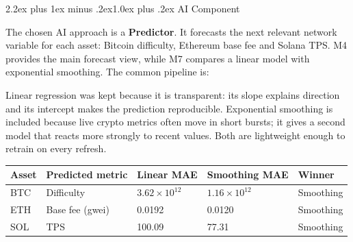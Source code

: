 \documentclass[11pt,a4paper]{article}
\makeatletter
\renewcommand{\section}{\@startsection{section}{1}{0pt}%
  {2.2ex plus 1ex minus .2ex}{1.0ex plus .2ex}%
  {\color{btcgreen}\large\bfseries\sffamily}}
\makeatother
\begin{document}
\section{AI Component}

The chosen AI approach is a \textbf{Predictor}. It forecasts the next relevant
network variable for each asset: Bitcoin difficulty, Ethereum base fee and
Solana TPS. M4 provides the main forecast view, while M7 compares a linear
model with exponential smoothing. The common pipeline is:

\begin{center}
\end{center}

Linear regression was kept because it is transparent: its slope explains
direction and its intercept makes the prediction reproducible. Exponential
smoothing is included because live crypto metrics often move in short bursts;
it gives a second model that reacts more strongly to recent values. Both are
lightweight enough to retrain on every refresh.

\begin{center}
\small
\renewcommand{\arraystretch}{1.18}
\begin{tabular}{@{}p{2.0cm}p{3.4cm}p{3.0cm}p{3.0cm}p{2.0cm}@{}}
\toprule
\textbf{Asset} & \textbf{Predicted metric} & \textbf{Linear MAE} & \textbf{Smoothing MAE} & \textbf{Winner} \\
\midrule
BTC & Difficulty & $3.62{\times}10^{12}$ & $1.16{\times}10^{12}$ & Smoothing \\
ETH & Base fee (gwei) & 0.0192 & 0.0120 & Smoothing \\
SOL & TPS & 100.09 & 77.31 & Smoothing \\
\bottomrule
\end{tabular}
\end{center}
\end{document}
